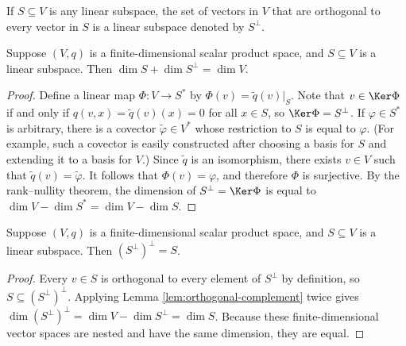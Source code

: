 If $S \subseteq V$ is any linear subspace, the set of vectors in $V$ that are orthogonal to every vector in $S$ is a linear subspace denoted by $S^{\perp}$.

\begin{lemma}
\label{lem:orthogonal-complement}
\leanok
{}
Suppose $(V, q)$ is a finite-dimensional scalar product space, and $S \subseteq V$ is a linear subspace. Then $\dim S + \dim S^{\perp} = \dim V$.
\end{lemma}

\begin{proof}
\leanok
Define a linear map $\Phi : V \to S^*$ by $\Phi(v) = \tilde{q}(v)|_S$. Note that $v \in \Ker\Phi$ if and only if $q(v,x) = \tilde{q}(v)(x) = 0$ for all $x \in S$, so $\Ker\Phi = S^\perp$. If $\varphi \in S^*$ is arbitrary, there is a covector $\tilde{\varphi} \in V^*$ whose restriction to $S$ is equal to $\varphi$. (For example, such a covector is easily constructed after choosing a basis for $S$ and extending it to a basis for $V$.) Since $\tilde{q}$ is an isomorphism, there exists $v \in V$ such that $\tilde{q}(v) = \tilde{\varphi}$. It follows that $\Phi(v) = \varphi$, and therefore $\Phi$ is surjective. By the rank--nullity theorem, the dimension of $S^\perp = \Ker\Phi$ is equal to $\dim V - \dim S^* = \dim V - \dim S$.
\end{proof}

\begin{lemma}
\label{lem:orthogonal-complement-involution}
\leanok
{}
Suppose $(V, q)$ is a finite-dimensional scalar product space, and $S \subseteq V$ is a linear subspace. Then $(S^{\perp})^{\perp} = S$.
\end{lemma}

\begin{proof}
\leanok
{}
Every $v \in S$ is orthogonal to every element of $S^\perp$ by definition, so $S \subseteq (S^\perp)^\perp$. Applying Lemma \ref{lem:orthogonal-complement} twice gives $\dim (S^\perp)^\perp = \dim V - \dim S^\perp = \dim S$. Because these finite-dimensional vector spaces are nested and have the same dimension, they are equal.
\end{proof}

